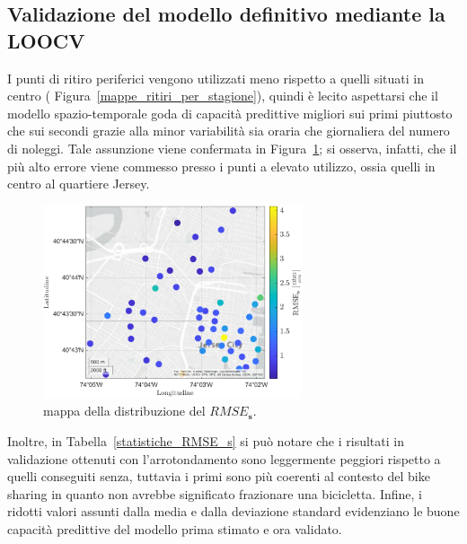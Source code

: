 \subsection{Validazione del modello definitivo mediante la LOOCV}
I punti di ritiro periferici vengono utilizzati meno rispetto a quelli situati in centro ( Figura~\ref{mappe_ritiri_per_stagione}),  quindi è lecito aspettarsi che il modello spazio-temporale goda di capacità predittive migliori sui primi piuttosto che sui secondi grazie alla minor variabilità sia oraria che giornaliera del numero di noleggi. Tale assunzione viene confermata in Figura~\ref{mappa_RMSE_s}; si osserva, infatti, che il più alto errore viene commesso presso i punti a elevato utilizzo, ossia quelli in centro al quartiere Jersey.

\begin{figure}[htpb]
	\centering
	\includegraphics[height=215px]{Immagini/4. Caso di studio/LOOCV/RMSE_s}
	\caption[Mappa della distribuzione del $RMSE_\mathbf{s}$]{mappa della distribuzione del $RMSE_\mathbf{s}$.}
	\label{mappa_RMSE_s}
\end{figure}

Inoltre, in Tabella~\ref{statistiche_RMSE_s} si può notare che i risultati in validazione ottenuti con l'arrotondamento sono leggermente peggiori rispetto a quelli conseguiti senza, tuttavia i primi sono più coerenti al contesto del bike sharing in quanto non avrebbe significato frazionare una bicicletta. Infine, i ridotti valori assunti dalla media e dalla deviazione standard evidenziano le buone capacità predittive del modello prima stimato e ora validato.


